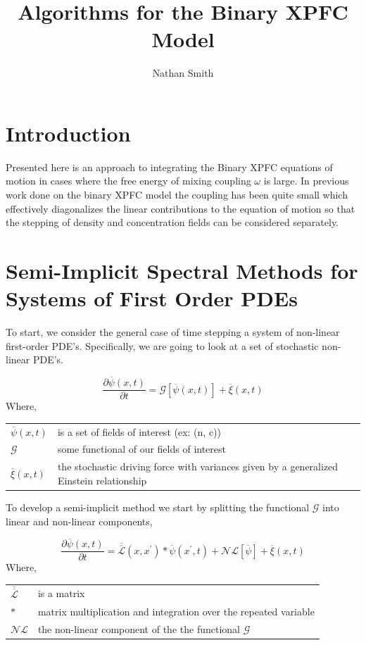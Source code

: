 \documentclass[11pt]{article}
\title{Algorithms for the Binary XPFC Model}
\author{Nathan Smith}
\makeatletter
\newenvironment{conditions}
  {\par\vspace{\abovedisplayskip}\noindent\begin{tabular}{>{$}l<{$} @{${}={}$} l}}
  {\end{tabular}\par\vspace{\belowdisplayskip}}
\newcommand{\f}{\frac}
\newcommand*{\tn}[1]{\overline{\overline{#1}}}
\renewcommand*{\vec}[1]{\overline{#1}}
\makeatother
\begin{document}
\maketitle

\section{Introduction}

Presented here is an approach to integrating the Binary XPFC equations of motion in cases where the free energy of mixing coupling $\omega$ is large. In previous work done on the binary XPFC model the coupling has been quite small which effectively diagonalizes the linear contributions to the equation of motion so that the stepping of density and concentration fields can be considered separately. 

\section{Semi-Implicit Spectral Methods for Systems of First Order PDEs}  

To start, we consider the general case of time stepping  a system of non-linear first-order PDE's. Specifically, we are going to look at a set of stochastic non-linear PDE's.

\begin{equation}
	\f{\partial \vec{\psi}(x, t)}{\partial t} = \mathcal{G}\left[\vec{\psi}(x, t)\right] + \vec{\xi}(x, t)
\end{equation} 
Where,
\begin{conditions}
	\vec{\psi}(x, t) & is a set of fields of interest (ex: (n, c))\\
	\mathcal{G} & some functional of our fields of interest \\
	\vec{\xi}(x, t) & the stochastic driving force with variances given by a generalized Einstein relationship
\end{conditions}

To develop a semi-implicit method we start by splitting the functional $\mathcal{G}$ into linear and non-linear components, 

\begin{equation}
	\f{\partial \vec{\psi}(x, t)}{\partial t} = \tn{\mathcal{L}}(x, x^\prime) \ast \vec{\psi}(x^\prime, t) 
	+ \mathcal{NL}\left[\vec{\psi}\right] + \vec{\xi}(x, t)
\end{equation} 
Where,
\begin{conditions}
	\tn{\mathcal{L}} & is a matrix \\
	\ast &  matrix multiplication and integration over the repeated variable \\
	\mathcal{NL} & the non-linear component of the the functional $\mathcal{G}$
\end{conditions}
\end{document}
